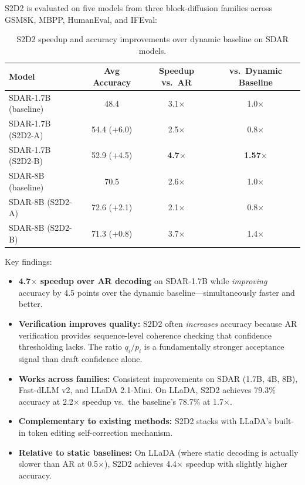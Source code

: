 \documentclass[11pt]{article}
\begin{document}
S2D2 is evaluated on five models from three block-diffusion families across GSM8K, MBPP, HumanEval, and IFEval:

\begin{table}[h]
\centering
\caption{S2D2 speedup and accuracy improvements over dynamic baseline on SDAR models.}
\begin{tabular}{lccc}
\toprule
\textbf{Model} & \textbf{Avg Accuracy} & \textbf{Speedup vs.\ AR} & \textbf{vs.\ Dynamic Baseline} \\
\midrule
SDAR-1.7B (baseline) & 48.4 & 3.1$\times$ & 1.0$\times$ \\
SDAR-1.7B (S2D2-A) & 54.4 (+6.0) & 2.5$\times$ & 0.8$\times$ \\
SDAR-1.7B (S2D2-B) & 52.9 (+4.5) & \textbf{4.7$\times$} & \textbf{1.57$\times$} \\
\midrule
SDAR-8B (baseline) & 70.5 & 2.6$\times$ & 1.0$\times$ \\
SDAR-8B (S2D2-A) & 72.6 (+2.1) & 2.1$\times$ & 0.8$\times$ \\
SDAR-8B (S2D2-B) & 71.3 (+0.8) & 3.7$\times$ & 1.4$\times$ \\
\bottomrule
\end{tabular}
\end{table}

Key findings:
\begin{itemize}
    \item \textbf{4.7$\times$ speedup over AR decoding} on SDAR-1.7B while \textit{improving} accuracy by 4.5 points over the dynamic baseline---simultaneously faster and better.
    \item \textbf{Verification improves quality:} S2D2 often \textit{increases} accuracy because AR verification provides sequence-level coherence checking that confidence thresholding lacks. The ratio $q_i/p_i$ is a fundamentally stronger acceptance signal than draft confidence alone.
    \item \textbf{Works across families:} Consistent improvements on SDAR (1.7B, 4B, 8B), Fast-dLLM v2, and LLaDA 2.1-Mini. On LLaDA, S2D2 achieves 79.3\% accuracy at 2.2$\times$ speedup vs.\ the baseline's 78.7\% at 1.7$\times$.
    \item \textbf{Complementary to existing methods:} S2D2 stacks with LLaDA's built-in token editing self-correction mechanism.
    \item \textbf{Relative to static baselines:} On LLaDA (where static decoding is actually slower than AR at 0.5$\times$), S2D2 achieves 4.4$\times$ speedup with slightly higher accuracy.
\end{itemize}
\end{document}
